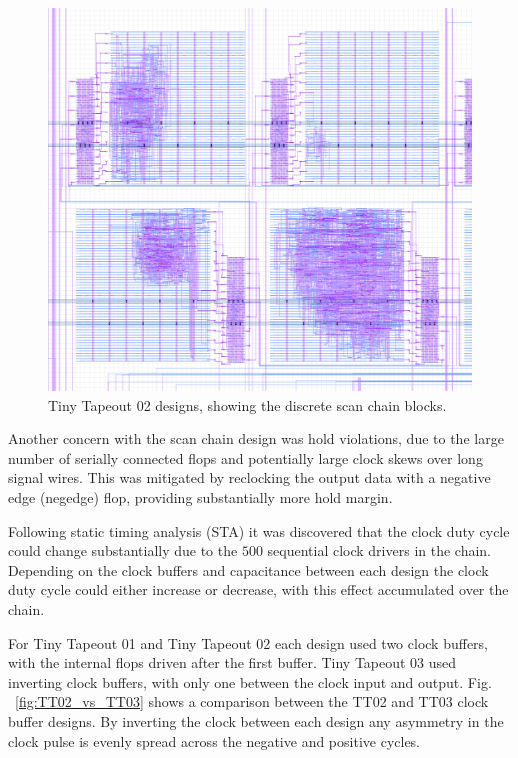 \begin{figure}[!t]
\centering
\includegraphics[width=\columnwidth]{./Figs/tt02_gds_zoom.png}
\caption{Tiny Tapeout 02 designs, showing the discrete scan chain blocks.}
\label{fig:TT02_separate_scan_blocks}
\end{figure}

Another concern with the scan chain design was hold violations, due to the large number of serially connected flops and potentially large clock skews over long signal wires. This was mitigated by reclocking the output data with a negative edge (negedge) flop, providing substantially more hold margin.

Following static timing analysis (STA) it was discovered that the clock duty cycle could change substantially due to the \(500\) sequential clock drivers in the chain. Depending on the clock buffers and capacitance between each design the clock duty cycle could either increase or decrease, with this effect accumulated over the chain.

For Tiny Tapeout 01 and Tiny Tapeout 02 each design used two clock buffers, with the internal flops driven after the first buffer.
Tiny Tapeout 03 used inverting clock buffers, with only one between the clock input and output. Fig. ~\ref{fig:TT02_vs_TT03} shows a comparison between the TT02 and TT03 clock buffer designs. By inverting the clock between each design any asymmetry in the clock pulse is evenly spread across the negative and positive cycles.


